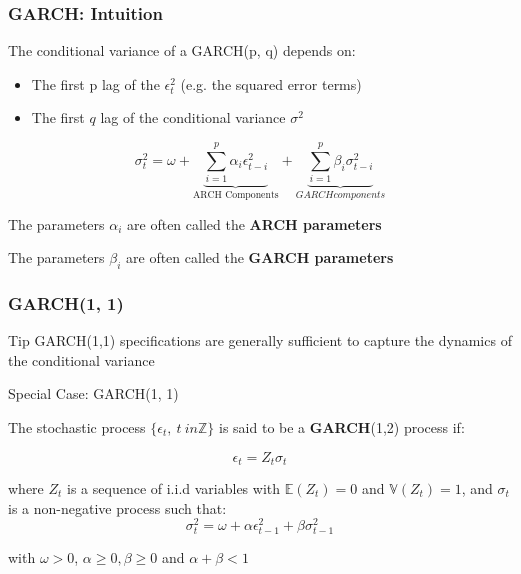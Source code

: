 \documentclass{beamer}
\newenvironment{wideitemize}{\itemize\addtolength{\itemsep}{10pt}}{\enditemize}
\begin{document}
\begin{frame}
  \frametitle{GARCH: Intuition}
  \begin{wideitemize}
  \item The conditional variance of a GARCH(p, q) depends on:
    \begin{itemize}
    \item The first p lag of the $\epsilon_t^2$ (e.g. the squared error terms)
    \item The first $q$ lag of the conditional variance $\sigma^2$
    \end{itemize}

 \begin{equation*}
    \sigma^2_t = \omega + \underbrace{\sum^p_{i=1} \alpha_i \epsilon^2_{t-i}}_{\text{ARCH Components}} + \underbrace{\sum^p_{i=1} \beta_i \sigma^2_{t-i}}_{GARCH components}
  \end{equation*}
    
   
  \item The parameters $\alpha_i$ are often called the \textbf{ARCH parameters}
  \item The parameters $\beta_i$ are often called the \textbf{GARCH parameters}
\end{wideitemize}
  
\end{frame}

\begin{frame}
  \frametitle{GARCH(1, 1)}

  \begin{alertblock}{Tip}
GARCH(1,1) specifications are generally sufficient to capture the dynamics of the conditional variance
  \end{alertblock}

  \medskip
  
\begin{block}{Special Case: GARCH(1, 1)}

  The stochastic process $\{ \epsilon_t, \ t \ in \mathbb{Z} \}$ is said to be a \textbf{GARCH}(1,2) process if:

  \begin{equation*}
    \epsilon_t = Z_t \sigma_t
  \end{equation*}

  \medskip

  where $Z_t$ is a sequence of i.i.d variables with $\mathbb{E}(Z_t) = 0$ and $\mathbb{V}(Z_t) = 1$, and $\sigma_t$ is a non-negative process such that:
  \begin{equation*}
    \sigma^2_t = \omega + \alpha \epsilon^2_{t-1} + \beta \sigma^2_{t-1}
  \end{equation*}

  \medskip

  with $\omega >0$, $\alpha \geq 0, \beta \geq 0$ and $\alpha + \beta <1$  
\end{block}
\end{frame}
\end{document}
